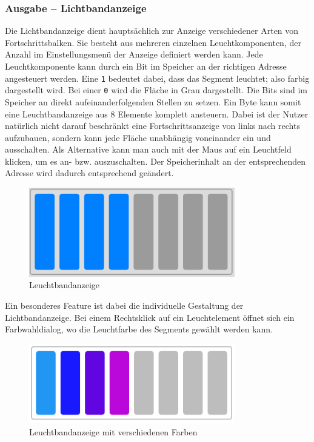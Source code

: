 \subsubsection{Ausgabe -- Lichtbandanzeige}

Die Lichtbandanzeige dient hauptsächlich zur Anzeige verschiedener Arten von
Fortschrittsbalken. Sie besteht aus mehreren einzelnen Leuchtkomponenten, der
Anzahl im Einstellungsmenü der Anzeige definiert werden kann. Jede
Leuchtkomponente kann durch ein Bit im Speicher an der richtigen Adresse
angesteuert werden. Eine \texttt{1} bedeutet dabei, dass das Segment leuchtet;
also farbig dargestellt wird. Bei einer \texttt{0} wird die Fläche in Grau
dargestellt. Die Bits sind im Speicher an direkt aufeinanderfolgenden Stellen zu
setzen. Ein Byte kann somit eine Leuchtbandanzeige aus 8 Elemente komplett
ansteuern. Dabei ist der Nutzer natürlich nicht darauf beschränkt eine
Fortschrittsanzeige von links nach rechts aufzubauen, sondern kann jede Fläche
unabhängig voneinander ein und ausschalten. Als Alternative kann man auch mit
der Maus auf ein Leuchtfeld klicken, um es an- bzw. auszuschalten. Der
Speicherinhalt an der entsprechenden Adresse wird dadurch entsprechend
geändert.\\


\begin{figure}[ht]
	\centering
  \includegraphics[width=0.8\textwidth]{Images/Lightstrip}
	\caption{Leuchtbandanzeige}
	\label{Lightstrip}
\end{figure}

Ein besonderes Feature ist dabei die individuelle Gestaltung der
Lichtbandanzeige. Bei einem Rechtsklick auf ein Leuchtelement öffnet sich ein
Farbwahldialog, wo die Leuchtfarbe des Segments gewählt werden kann.

\begin{figure}[ht]
	\centering
  \includegraphics[width=0.8\textwidth]{Images/Lightstrip_colors}
	\caption{Leuchtbandanzeige mit verschiedenen Farben}
	\label{Lightstrip_Colors}
\end{figure}


